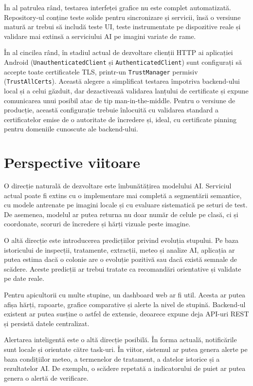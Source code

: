 În al patrulea rând, testarea interfeței grafice nu este complet automatizată. Repository-ul conține teste solide pentru sincronizare și servicii, însă o versiune matură ar trebui să includă teste UI, teste instrumentate pe dispozitive reale și validare mai extinsă a serviciului AI pe imagini variate de rame.

În al cincilea rând, în stadiul actual de dezvoltare clienții HTTP ai aplicației Android (\texttt{UnauthenticatedClient} și \texttt{AuthenticatedClient}) sunt configurați să accepte toate certificatele TLS, printr-un \texttt{TrustManager} permisiv (\texttt{TrustAllCerts}). Această alegere a simplificat testarea împotriva backend-ului local și a celui găzduit, dar dezactivează validarea lanțului de certificate și expune comunicarea unui posibil atac de tip man-in-the-middle. Pentru o versiune de producție, această configurație trebuie înlocuită cu validarea standard a certificatelor emise de o autoritate de încredere și, ideal, cu certificate pinning pentru domeniile cunoscute ale backend-ului.

\section{Perspective viitoare}

O direcție naturală de dezvoltare este îmbunătățirea modelului AI. Serviciul actual poate fi extins cu o implementare mai completă a segmentării semantice, cu modele antrenate pe imagini locale și cu evaluare sistematică pe seturi de test. De asemenea, modelul ar putea returna nu doar număr de celule pe clasă, ci și coordonate, scoruri de încredere și hărți vizuale peste imagine.

O altă direcție este introducerea predicțiilor privind evoluția stupului. Pe baza istoricului de inspecții, tratamente, extracții, meteo și analize AI, aplicația ar putea estima dacă o colonie are o evoluție pozitivă sau dacă există semnale de scădere. Aceste predicții ar trebui tratate ca recomandări orientative și validate pe date reale.

Pentru apicultorii cu multe stupine, un dashboard web ar fi util. Acesta ar putea afișa hărți, rapoarte, grafice comparative și alerte la nivel de stupină. Backend-ul existent ar putea susține o astfel de extensie, deoarece expune deja API-uri REST și persistă datele centralizat.

Alertarea inteligentă este o altă direcție posibilă. În forma actuală, notificările sunt locale și orientate către task-uri. În viitor, sistemul ar putea genera alerte pe baza condițiilor meteo, a termenelor de tratament, a datelor istorice și a rezultatelor AI. De exemplu, o scădere repetată a indicatorului de puiet ar putea genera o alertă de verificare.

